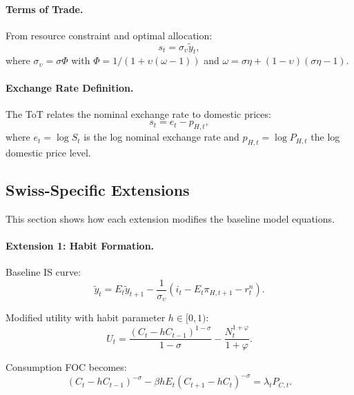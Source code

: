 \documentclass[12pt,a4paper]{article}
\begin{document}
\begin{appendices}
\paragraph{Terms of Trade.}
From resource constraint and optimal allocation:
\begin{equation}
	s_t = \sigma_\upsilon\tilde{y}_t,
	\label{eq:app_tot}
\end{equation}
where $\sigma_\upsilon = \sigma\Phi$ with $\Phi = 1/(1+\upsilon(\omega-1))$ and $\omega = \sigma\eta + (1-\upsilon)(\sigma\eta-1)$.

\paragraph{Exchange Rate Definition.}
The ToT relates the nominal exchange rate to domestic prices:
\begin{equation}
	s_t = e_t - p_{H,t},
	\label{eq:app_er_def}
\end{equation}
where $e_t = \log S_t$ is the log nominal exchange rate and $p_{H,t} = \log P_{H,t}$ the log domestic price level.

\subsection{Swiss-Specific Extensions}
\label{app:extensions}

This section shows how each extension modifies the baseline model equations.

\paragraph{Extension 1: Habit Formation.}
Baseline IS curve:
\begin{equation}
	\tilde{y}_t = E_t\tilde{y}_{t+1} - \frac{1}{\sigma_\upsilon}(i_t - E_t\pi_{H,t+1} - r_t^n).
	\tag{Baseline}
\end{equation}

Modified utility with habit parameter $h \in [0,1)$:
\begin{equation}
	U_t = \frac{(C_t - hC_{t-1})^{1-\sigma}}{1-\sigma} - \frac{N_t^{1+\varphi}}{1+\varphi}.
\end{equation}

Consumption FOC becomes:
\begin{equation}
	(C_t - hC_{t-1})^{-\sigma} - \beta h E_t(C_{t+1} - hC_t)^{-\sigma} = \lambda_t P_{C,t}.
\end{equation}


\end{appendices}
\end{document}
